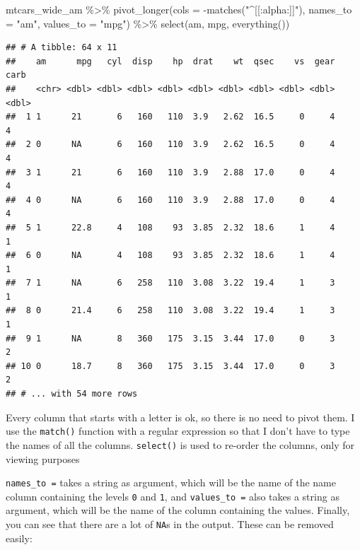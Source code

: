 \documentclass[
]{article}
\newenvironment{Shaded}{\begin{snugshade}}{\end{snugshade}}
\newcommand{\AttributeTok}[1]{\textcolor[rgb]{0.77,0.63,0.00}{#1}}
\newcommand{\FunctionTok}[1]{\textcolor[rgb]{0.00,0.00,0.00}{#1}}
\newcommand{\NormalTok}[1]{#1}
\newcommand{\SpecialCharTok}[1]{\textcolor[rgb]{0.00,0.00,0.00}{#1}}
\newcommand{\StringTok}[1]{\textcolor[rgb]{0.31,0.60,0.02}{#1}}
\begin{document}
\begin{Shaded}
\begin{Highlighting}[]
\NormalTok{mtcars\_wide\_am }\SpecialCharTok{\%\textgreater{}\%} 
  \FunctionTok{pivot\_longer}\NormalTok{(}\AttributeTok{cols =} \SpecialCharTok{{-}}\FunctionTok{matches}\NormalTok{(}\StringTok{"\^{}[[:alpha:]]"}\NormalTok{),}
               \AttributeTok{names\_to =} \StringTok{"am"}\NormalTok{,}
               \AttributeTok{values\_to =} \StringTok{"mpg"}\NormalTok{) }\SpecialCharTok{\%\textgreater{}\%} 
  \FunctionTok{select}\NormalTok{(am, mpg, }\FunctionTok{everything}\NormalTok{())}
\end{Highlighting}
\end{Shaded}

\begin{verbatim}
## # A tibble: 64 x 11
##    am      mpg   cyl  disp    hp  drat    wt  qsec    vs  gear  carb
##    <chr> <dbl> <dbl> <dbl> <dbl> <dbl> <dbl> <dbl> <dbl> <dbl> <dbl>
##  1 1      21       6   160   110  3.9   2.62  16.5     0     4     4
##  2 0      NA       6   160   110  3.9   2.62  16.5     0     4     4
##  3 1      21       6   160   110  3.9   2.88  17.0     0     4     4
##  4 0      NA       6   160   110  3.9   2.88  17.0     0     4     4
##  5 1      22.8     4   108    93  3.85  2.32  18.6     1     4     1
##  6 0      NA       4   108    93  3.85  2.32  18.6     1     4     1
##  7 1      NA       6   258   110  3.08  3.22  19.4     1     3     1
##  8 0      21.4     6   258   110  3.08  3.22  19.4     1     3     1
##  9 1      NA       8   360   175  3.15  3.44  17.0     0     3     2
## 10 0      18.7     8   360   175  3.15  3.44  17.0     0     3     2
## # ... with 54 more rows
\end{verbatim}

Every column that starts with a letter is ok, so there is no need to pivot them. I use the \texttt{match()}
function with a regular expression so that I don't have to type the names of all the columns. \texttt{select()}
is used to re-order the columns, only for viewing purposes

\texttt{names\_to\ =} takes a string as argument, which will be the name of the name column containing the
levels \texttt{0} and \texttt{1}, and \texttt{values\_to\ =} also takes a string as argument, which will be the name of
the column containing the values. Finally, you can see that there are a lot of \texttt{NA}s in the
output. These can be removed easily:
\end{document}
